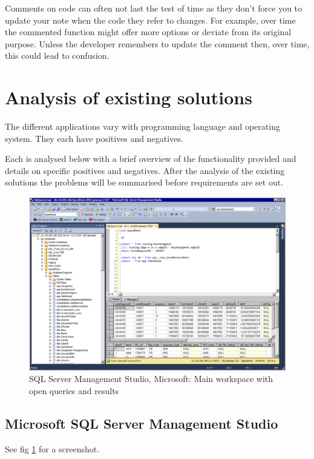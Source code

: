 Comments on code can often not last the test of time as they don't force you to
update your note when the code they refer to changes. For example, over time the
commented function might offer more options or deviate from its original
purpose. Unless the developer remembers to update the comment then, over time, this could lead to confusion.

\section{Analysis of existing solutions}\label{analysis-of-existing-solutions}

The different applications vary with programming language and
operating system. They each have positives and negatives.

Each is analysed below with a brief overview of the functionality provided and
details on specific positives and negatives. After the analysis of the existing
solutions the problems will be summarised before requirements are set out.


\begin{figure}
  \includegraphics[width=\linewidth]{Figures/SSMS.png}
  \caption{SQL Server Management Studio, Microsoft: Main workspace with open queries and results}
  \label{fig:ssms}
\end{figure}

\subsection{Microsoft SQL Server Management Studio}\label{microsoft-sql-server-management-studio}

\noindent
See fig \ref{fig:ssms} for a screenshot.

